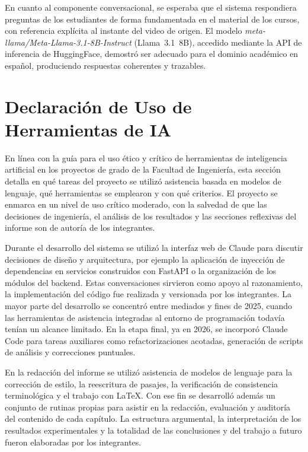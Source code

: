 En cuanto al componente conversacional, se esperaba que el sistema respondiera preguntas de los estudiantes de forma fundamentada en el material de los cursos, con referencia explícita al instante del video de origen. El modelo \textit{meta-llama/Meta-Llama-3.1-8B-Instruct} (Llama~3.1~8B), accedido mediante la API de inferencia de HuggingFace, demostró ser adecuado para el dominio académico en español, produciendo respuestas coherentes y trazables.

\section{Declaración de Uso de Herramientas de IA}
\label{section:1-Declaración de Uso de IA}

En línea con la guía para el uso ético y crítico de herramientas de inteligencia artificial en los proyectos de grado de la Facultad de Ingeniería, esta sección detalla en qué tareas del proyecto se utilizó asistencia basada en modelos de lenguaje, qué herramientas se emplearon y con qué criterios. El proyecto se enmarca en un nivel de uso crítico moderado, con la salvedad de que las decisiones de ingeniería, el análisis de los resultados y las secciones reflexivas del informe son de autoría de los integrantes.

Durante el desarrollo del sistema se utilizó la interfaz web de Claude para discutir decisiones de diseño y arquitectura, por ejemplo la aplicación de inyección de dependencias en servicios construidos con FastAPI o la organización de los módulos del backend. Estas conversaciones sirvieron como apoyo al razonamiento, la implementación del código fue realizada y versionada por los integrantes. La mayor parte del desarrollo se concentró entre mediados y fines de 2025, cuando las herramientas de asistencia integradas al entorno de programación todavía tenían un alcance limitado. En la etapa final, ya en 2026, se incorporó Claude Code para tareas auxiliares como refactorizaciones acotadas, generación de scripts de análisis y correcciones puntuales.

En la redacción del informe se utilizó asistencia de modelos de lenguaje para la corrección de estilo, la reescritura de pasajes, la verificación de consistencia terminológica y el trabajo con LaTeX. Con ese fin se desarrolló además un conjunto de rutinas propias para asistir en la redacción, evaluación y auditoría del contenido de cada capítulo. La estructura argumental, la interpretación de los resultados experimentales y la totalidad de las conclusiones y del trabajo a futuro fueron elaboradas por los integrantes.

